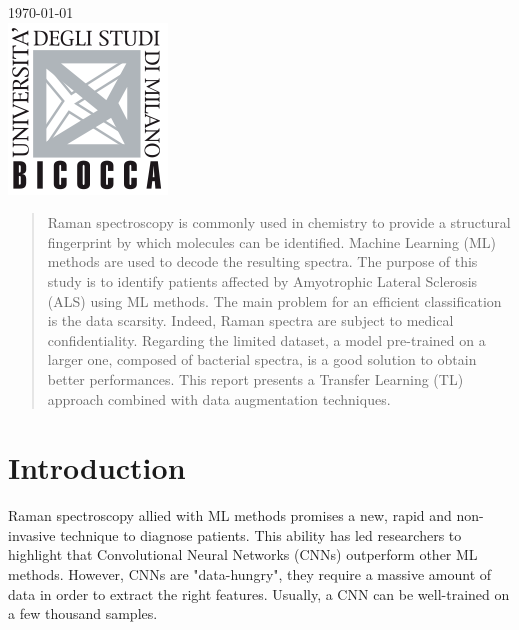 \begin{titlepage}
{\large \today}\\[1cm] %


\includegraphics{logo.png}\\[1cm] %
 

\vfill %

\end{titlepage}


\begin{abstract}
Raman spectroscopy is commonly used in chemistry to provide a structural fingerprint by which molecules can be identified. Machine Learning (ML) methods are used to decode the resulting spectra. The purpose of this study is to identify patients affected by Amyotrophic Lateral Sclerosis (ALS) using ML methods. The main problem for an efficient classification is the data scarsity. Indeed, Raman spectra are subject to medical confidentiality. Regarding the limited dataset, a model pre-trained on a larger one, composed of bacterial spectra, is a good solution to obtain better performances. 
This report presents a Transfer Learning (TL) approach combined with data augmentation techniques.
\end{abstract}


\section{Introduction}

Raman spectroscopy allied with ML methods promises a new, rapid and non-invasive technique to diagnose patients. This ability has led researchers to highlight that Convolutional Neural Networks (CNNs) outperform other ML methods. However, CNNs are "data-hungry", they require a massive amount of data in order to extract the right features. Usually, a CNN can be well-trained on a few thousand samples. 

